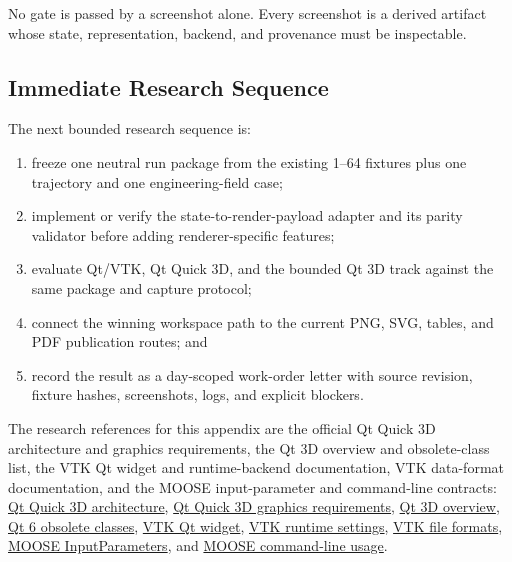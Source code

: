 \documentclass[11pt,a4paper]{article}
\begin{document}
No gate is passed by a screenshot alone.  Every screenshot is a derived
artifact whose state, representation, backend, and provenance must be
inspectable.

\subsection{Immediate Research Sequence}

The next bounded research sequence is:

\begin{enumerate}
  \item freeze one neutral run package from the existing 1--64 fixtures plus
        one trajectory and one engineering-field case;
  \item implement or verify the state-to-render-payload adapter and its parity
        validator before adding renderer-specific features;
  \item evaluate Qt/VTK, Qt Quick 3D, and the bounded Qt 3D track against the
        same package and capture protocol;
  \item connect the winning workspace path to the current PNG, SVG, tables,
        and PDF publication routes; and
  \item record the result as a day-scoped work-order letter with source
        revision, fixture hashes, screenshots, logs, and explicit blockers.
\end{enumerate}

The research references for this appendix are the official Qt Quick 3D
architecture and graphics requirements, the Qt 3D overview and obsolete-class
list, the VTK Qt widget and runtime-backend documentation, VTK data-format
documentation, and the MOOSE input-parameter and command-line contracts:
\href{https://doc.qt.io/qt-6/qtquick3d-architecture.html}{Qt Quick 3D
architecture},
\href{https://doc.qt.io/qt-6/qtquick3d-requirements.html}{Qt Quick 3D graphics
requirements},
\href{https://doc.qt.io/qt-6/qt3d-overview.html}{Qt 3D overview},
\href{https://doc.qt.io/qt-6/obsoleteclasses.html}{Qt 6 obsolete classes},
\href{https://vtk.org/doc/nightly/html/classQVTKOpenGLNativeWidget.html}{VTK
Qt widget},
\href{https://docs.vtk.org/en/latest/advanced/runtime_settings.html}{VTK
runtime settings},
\href{https://docs.vtk.org/en/latest/vtk_file_formats/vtkxml_file_format.html}{VTK
file formats},
\href{https://mooseframework.inl.gov/source/utils/InputParameters.html}{MOOSE
InputParameters}, and
\href{https://mooseframework.inl.gov/moose/application_usage/command_line_usage.html}{MOOSE
command-line usage}.
\end{document}

